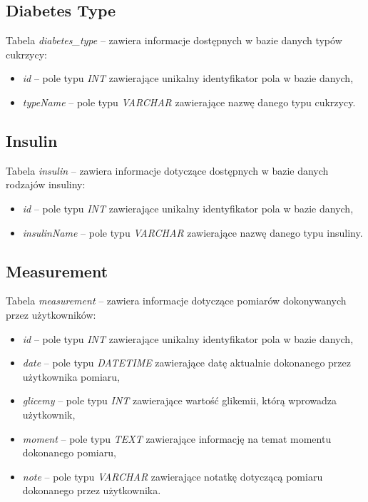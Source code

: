 \subsection{Diabetes Type}
Tabela \textit{diabetes\_type} -- zawiera informacje dostępnych w bazie danych typów cukrzycy:
\begin{itemize}
	\item \textit{id} -- pole typu \textit{INT} zawierające unikalny identyfikator pola w bazie danych,
	\item \textit{typeName} -- pole typu \textit{VARCHAR} zawierające nazwę danego typu cukrzycy.
\end{itemize}

\subsection{Insulin}
Tabela \textit{insulin} -- zawiera informacje dotyczące dostępnych w bazie danych rodzajów insuliny:
\begin{itemize}
	\item \textit{id} -- pole typu \textit{INT} zawierające unikalny identyfikator pola w bazie danych,
	\item \textit{insulinName} -- pole typu \textit{VARCHAR} zawierające nazwę danego typu insuliny.
\end{itemize}

\subsection{Measurement}
Tabela \textit{measurement} -- zawiera informacje dotyczące pomiarów dokonywanych przez użytkowników:
\begin{itemize}
	\item \textit{id} -- pole typu \textit{INT} zawierające unikalny identyfikator pola w bazie danych,
	\item \textit{date} -- pole typu \textit{DATETIME} zawierające datę aktualnie dokonanego przez użytkownika pomiaru,
	\item \textit{glicemy} -- pole typu \textit{INT} zawierające wartość glikemii, którą wprowadza użytkownik,
	\item \textit{moment} -- pole typu \textit{TEXT} zawierające informację na temat momentu dokonanego pomiaru,
	\item \textit{note} -- pole typu \textit{VARCHAR} zawierające notatkę dotyczącą pomiaru dokonanego przez użytkownika.
\end{itemize}

